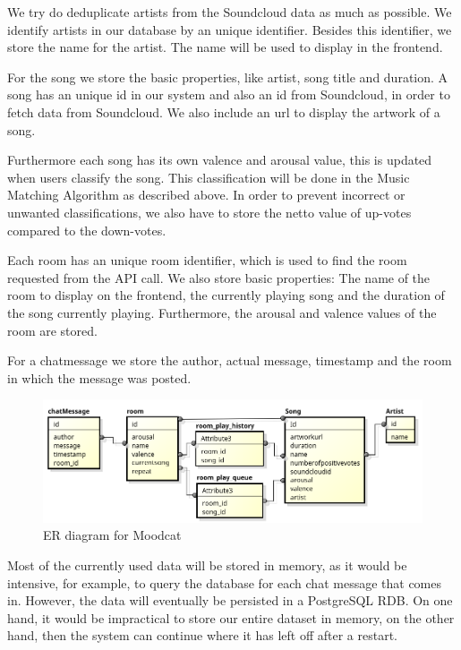 \par
We try do deduplicate artists from the Soundcloud data as much as possible. We identify artists in our database by an unique identifier. Besides this identifier, we store the name for the artist. The name will be used to display in the frontend.

\par
For the song we store the basic properties, like artist, song title and duration.
A song has an unique id in our system and also an id from \gls{Soundcloud}, in order to fetch data from Soundcloud.
We also include an url to display the artwork of a song.

Furthermore each song has its own \gls{valence} and \gls{arousal} value, this is updated when users classify the song.
This classification will be done in the Music Matching Algorithm as described above. In order to prevent incorrect or unwanted classifications, we also have to store the netto value of up-votes compared to the down-votes.

\par 
Each room has an unique room identifier, which is used to find the room requested from the API call.
We also store basic properties: The name of the room to display on the frontend, the currently playing song and the duration of the song currently playing.
Furthermore, the arousal and valence values of the room are stored.

\par
For a chatmessage we store the author, actual message, timestamp and the room in which the message was posted.

\begin{figure}[H]
\includegraphics[scale=.6]{erDiagram.png}
\caption{ER diagram for Moodcat}
\label{fig:ER diagram of the described entities}
\end{figure}

\par
Most of the currently used data will be stored in memory, as it would be intensive, for example, to query the database for each chat message that comes in.
However, the data will eventually be persisted in a PostgreSQL\cite{PostgreSQL} \gls{RDB}.
On one hand, it would be impractical to store our entire dataset in memory, on the other hand, then the system can continue where it has left off after a restart.

